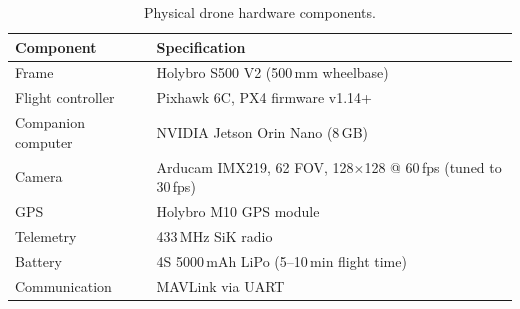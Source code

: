 \begin{table}[H]
    \small
    \centering
    \caption{Physical drone hardware components.}
    \label{tab:hardware}
    \begin{tabular}{p{4cm} p{9cm}}
        \hline\hline
        \rowcolor{lightgray}\textbf{Component} & \textbf{Specification} \\\hline
        Frame & Holybro S500 V2 (500\,mm wheelbase) \\
        \rowcolor{lightlightgray} Flight controller & Pixhawk 6C, PX4 firmware v1.14+ \\
        Companion computer & NVIDIA Jetson Orin Nano (8\,GB) \\
        \rowcolor{lightlightgray} Camera & Arducam IMX219, 62\textdegree{} FOV, 128$\times$128 @ 60\,fps (tuned to 30\,fps) \\
        GPS & Holybro M10 GPS module \\
        \rowcolor{lightlightgray} Telemetry & 433\,MHz SiK radio \\
        Battery & 4S 5000\,mAh LiPo (5--10\,min flight time) \\
        \rowcolor{lightlightgray} Communication & MAVLink via UART \\
        \hline
    \end{tabular}
\end{table}
